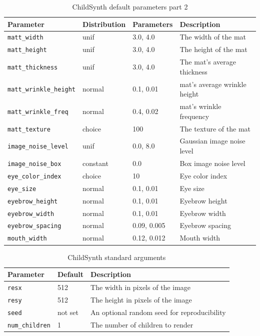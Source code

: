 \documentclass{article}
\begin{document}
\begin{table}[h]
    \centering
    \scriptsize
    \begin{tabular}{|l|l|l|l|}
    \hline
    \textbf{Parameter} & \textbf{Distribution} & \textbf{Parameters} & \textbf{Description} \\ 
    \hline
    \texttt{matt\_width} & unif & 3.0, 4.0 & The width of the mat\\
    \texttt{matt\_height} & unif & 3.0, 4.0 & The height of the mat\\
    \texttt{matt\_thickness} & unif & 3.0, 4.0 & The mat's average thickness\\
    \texttt{matt\_wrinkle\_height} & normal & 0.1, 0.01 & mat's average wrinkle height\\
    \texttt{matt\_wrinkle\_freq} & normal & 0.4, 0.02 & mat's wrinkle frequency\\
    \texttt{matt\_texture} & choice & 100 & The texture of the mat\\
    \texttt{image\_noise\_level} & unif & 0.0, 8.0 & Gaussian image noise level\\
    \texttt{image\_noise\_box} & constant & 0.0 & Box image noise level\\
    \texttt{eye\_color\_index} & choice & 10 & Eye color index\\
    \texttt{eye\_size} & normal & 0.1, 0.01 & Eye size\\
    \texttt{eyebrow\_height} & normal & 0.1, 0.01 & Eyebrow height\\
    \texttt{eyebrow\_width} & normal & 0.1, 0.01 & Eyebrow width\\
    \texttt{eyebrow\_spacing} & normal & 0.09, 0.005 & Eyebrow spacing\\
    \texttt{mouth\_width} & normal & 0.12, 0.012 & Mouth width\\
    \hline
    \end{tabular}
    \caption{ChildSynth default parameters part 2}
    \label{table:defaults_2}
\end{table}

\begin{table}[h]
    \centering
    \scriptsize
    \begin{tabular}{|l|l|l|}
    \hline
    \textbf{Parameter} & \textbf{Default} & \textbf{Description} \\ 
    \hline
    \texttt{resx} & 512 & The width in pixels of the image\\
    \texttt{resy} & 512 & The height in pixels of the image\\
    \texttt{seed} & not set & An optional random seed for reproducibility\\
    \texttt{num\_children} & 1 & The number of children to render\\
    \hline
    \end{tabular}
    \caption{ChildSynth standard arguments}
    \label{table:params}
\end{table}
\end{document}
